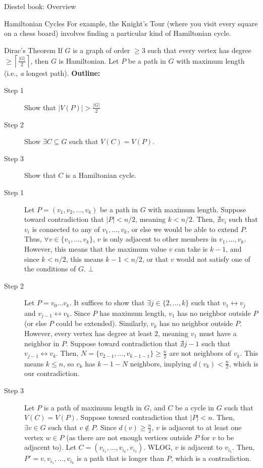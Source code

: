 \documentclass[10pt]{extarticle}
\begin{document}
\begin{problem}{Diestel book: Overview}
\begin{problem}{Hamiltonian Cycles}
      For example, the Knight's Tour (where you visit every square on a chess board) involves finding a particular kind of Hamiltonian cycle. 
    \end{problem}
    \begin{problem}{Dirac's Theorem}
      If $G$ is a graph of order $\geq 3$ such that every vertex has degree $\geq \left\lceil\frac{|G|}{2}\right\rceil$, then $G$ is Hamiltonian.
      \tcblower
      Let $P$ be a path in $G$ with maximum length (i.e., \textit{a} longest path).
      \textbf{Outline:}
      \begin{description}
        \item[Step 1] Show that $|V(P)| > \frac{|G|}{2}$
        \item[Step 2] Show $\exists C\subseteq G$ such that $V(C) = V(P)$.
        \item[Step 3] Show that $C$ is a Hamiltonian cycle.
      \end{description}
      \begin{description}
        \item[Step 1] Let $P = (v_1,v_2,\dots,v_k)$ be a path in $G$ with maximum length. Suppose toward contradiction that $|P| < n/2$, meaning $k< n/2$. Then, $\nexists v_i$ such that $v_i$ is connected to any of $v_1,\dots,v_k$, or else we would be able to extend $P$. Thus, $\forall v\in \{v_1,\dots,v_k\}$, $v$ is only adjacent to other members in $v_1,\dots,v_k$. However, this means that the maximum value $v$ can take is $k-1$, and since $k < n/2$, this means $k-1 < n/2$, or that $v$ would not satisfy one of the conditions of $G$. $\bot$
        \item[Step 2] Let $P=v_0\dots v_k$. It suffices to show that $\exists j\in \{2,\dots,k\}$ such that $v_1\leftrightarrow v_j$ and $v_{j-1} \leftrightarrow v_k$. Since $P$ has maximum length, $v_1$ has no neighbor outside $P$ (or else $P$ could be extended). Similarly, $v_k$ has no neighbor outside $P$. However, every vertex has degree at least $2$, meaning $v_1$ must have a neighbor in $P$. Suppose toward contradiction that $\nexists j-1$ such that $v_{j-1} \leftrightarrow v_k$. Then, $N = \{v_{2-1},\dots,v_{k-1-1}\}\geq \frac{n}{2}$ are not neighbors of $v_k$. This means $k\leq n$, so $v_k$ has $k-1-N$ neighbors, implying $d(v_k) < \frac{n}{2}$, which is our contradiction.
        \item[Step 3] Let $P$ is a path of maximum length in $G$, and $C$ be a cycle in $G$ such that $V(C) = V(P)$. Suppose toward contradiction that $|P| < n$. Then, $\exists v\in G$ such that $v\notin P$. Since $d(v) \geq \frac{n}{2}$, $v$ is adjacent to at least one vertex $w\in P$ (as there are not enough vertices outside $P$ for $v$ to be adjacent to). Let $C = (v_{i_1},\dots,v_{i_k},v_{i_1})$. WLOG, $v$ is adjacent to $v_{i_1}$. Then, $P' = v,v_{i_1},\dots,v_{i_k}$ is a path that is longer than $P$, which is a contradiction.

\end{description}
\end{problem}
\end{problem}
\end{document}
